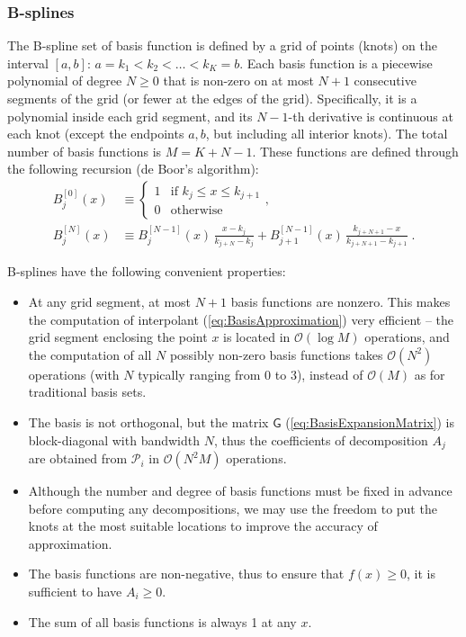\documentclass[12pt]{article}
\begin{document}
\subsubsection{B-splines}  \label{sec:MathBSplineDetails}

The B-spline set of basis function is defined by a grid of points (knots) on the interval $[a,b]$: $a=k_1<k_2<\dots<k_K=b$. Each basis function is a piecewise polynomial of degree $N\ge 0$ that is non-zero on at most $N+1$ consecutive segments of the grid (or fewer at the edges of the grid). Specifically, it is a polynomial inside each grid segment, and its $N-1$-th derivative is continuous at each knot (except the endpoints $a,b$, but including all interior knots). The total number of basis functions is $M=K+N-1$. These functions are defined through the following recursion (de Boor's algorithm):
\begin{subequations}
\begin{align}
B^{[0]}_j(x) &\equiv \left\{ \begin{array}{ll} 1 &\mbox{if }k_j \le x \le k_{j+1} \\ 0 & \mbox{otherwise} \end{array} \right., \\
B^{[N]}_j(x) &\equiv B^{[N-1]}_j(x)\,\frac{x-k_j}{k_{j+N}-k_j} +
B^{[N-1]}_{j+1}(x)\,\frac{k_{j+N+1}-x}{k_{j+N+1}-k_{j+1}} \;.
\end{align}
\end{subequations}

B-splines have the following convenient properties:
\begin{itemize}
\item At any grid segment, at most $N+1$ basis functions are nonzero. This makes the computation of interpolant (\ref{eq:BasisApproximation}) very efficient -- the grid segment enclosing the point $x$ is located in $\mathcal{O}(\log M)$ operations, and the computation of all $N$ possibly non-zero basis functions takes $\mathcal{O}(N^2)$ operations (with $N$ typically ranging from 0 to 3), instead of $\mathcal{O}(M)$ as for traditional basis sets.
\item The basis is not orthogonal, but the matrix $\mathsf G$ (\ref{eq:BasisExpansionMatrix}) is block-diagonal with bandwidth $N$, thus the coefficients of decomposition $A_j$ are obtained from $\mathcal P_i$ in $\mathcal{O}(N^2M)$ operations.
\item Although the number and degree of basis functions must be fixed in advance before computing any decompositions, we may use the freedom to put the knots at the most suitable locations to improve the accuracy of approximation.
\item The basis functions are non-negative, thus to ensure that $f(x) \ge 0$, it is sufficient to have $A_i\ge 0$. 
\item The sum of all basis functions is always 1 at any $x$.
\end{itemize}
\end{document}
